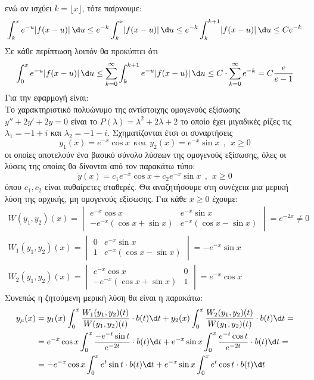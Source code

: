 \documentclass[a4paper,twoside,11pt]{book}
\DeclareRobustCommand{\frac}[3][0pt]{%
{\begingroup\hspace{#1}#2\hspace{#1}\endgroup\over\hspace{#1}#3\hspace{#1}}}
\begin{document}
ενώ αν ισχύει $k = \lfloor x\rfloor$, τότε παίρνουμε:
\[\int_k^x e^{-u}\lvert f(x-u)\rvert\,\d u \leq e^{-k} \int_k^x \lvert f(x-u)\rvert\,\d u\leq e^{-k} \int_k^{k+1} \lvert f(x-u)\rvert\,\d u \leq C e^{-k} \]
Σε κάθε περίπτωση λοιπόν θα προκύπτει ότι
\[ \int_0^x e^{-u} \lvert f(x-u)\rvert\,\d u\leq \sum_{k=0}^{\infty}\int_k^{k+1} e^{-u}\lvert f(x-u)\rvert\,\d u \leq C\cdot \sum_{k = 0}^{\infty} e^{-k} = C\frac{e}{e-1} \]
Για την εφαρμογή είναι:\\
Το χαρακτηριστικό πολυώνυμο της αντίστοιχης ομογενούς εξίσωσης $ y''+2y'+2y=0 $ είναι το $ P(\lambda)=\lambda^2+2\lambda+2 $ το οποίο έχει μιγαδικές ρίζες τις $ \lambda_1=-1+i $ και $ \lambda_2=-1-i $. Σχηματίζονται έτσι οι συναρτήσεις  \[ y_1(x)=e^{-x}\cos{x }\ \ \textrm{και}\ \  y_2(x)=e^{-x}\sin{x }\ \ ,\ \ x\geq 0\] 
οι οποίες αποτελούν ένα βασικό σύνολο λύσεων της ομογενούς εξίσωσης, όλες οι λύσεις της οποίας θα δίνονται από τον παρακάτω τύπο:
\[ \tilde{y}(x)=c_1e^{-x}\cos{x }+c_2e^{-x}\sin{x }\ \ ,\ \ x\geq 0 \]
όπου $ c_1,c_2 $ είναι αυθαίρετες σταθερές. Θα αναζητήσουμε στη συνέχεια μια μερική λύση της αρχικής, μη ομογενούς εξίσωσης. Για κάθε $ x\geq0 $ έχουμε:
\begin{gather*}
W(y_1,y_2)(x)=\begin{vmatrix}
e^{-x}\cos{x } & e^{-x}\sin{x }\\
-e^{-x}\left( \cos{x }+\sin{x }\right)  & e^{-x}\left(\cos{x }-\sin{x }\right)
\end{vmatrix}=e^{-2x}\neq 0\\
W_1(y_1,y_2)(x)=\begin{vmatrix}
0 & e^{-x}\sin{x }\\
1 & e^{-x}\left(\cos{x }-\sin{x }\right) 
\end{vmatrix}=-e^{-x}\sin{x }\\
W_2(y_1,y_2)(x)=\begin{vmatrix}
e^{-x}\cos{x } & 0\\
-e^{-x}\left(\cos{x }+\sin{x }\right)  & 1
\end{vmatrix}=e^{-x}\cos{x }
\end{gather*}
Συνεπώς η ζητούμενη μερική λύση θα είναι η παρακάτω:
\begin{align*}
y_\mu(x)&=y_1(x)\int_{0}^{x}{\frac{W_1(y_1,y_2)(t)}{W(y_1,y_2)(t)}\cdot b(t)\d t}+y_2(x)\int_{0}^{x}{\frac{W_2(y_1,y_2)(t)}{W(y_1,y_2)(t)}\cdot b(t)\d t}=\\
&=e^{-x}\cos{x }\int_{0}^{x}{\frac{-e^{-t}\sin{t}}{e^{-2t}}\cdot b(t)\d t}+e^{-x}\sin{x }\int_{0}^{x}{\frac{e^{-t}\cos{t }}{e^{-2t}}\cdot b(t)\d t}=\\
&=-e^{-x}\cos{x }\int_{0}^{x}{e^{t}\sin{t}\cdot b(t)\d t}+e^{-x}\sin{x }\int_{0}^{x}{e^{t}\cos{t }\cdot b(t)\d t}
\end{align*}
\end{document}
